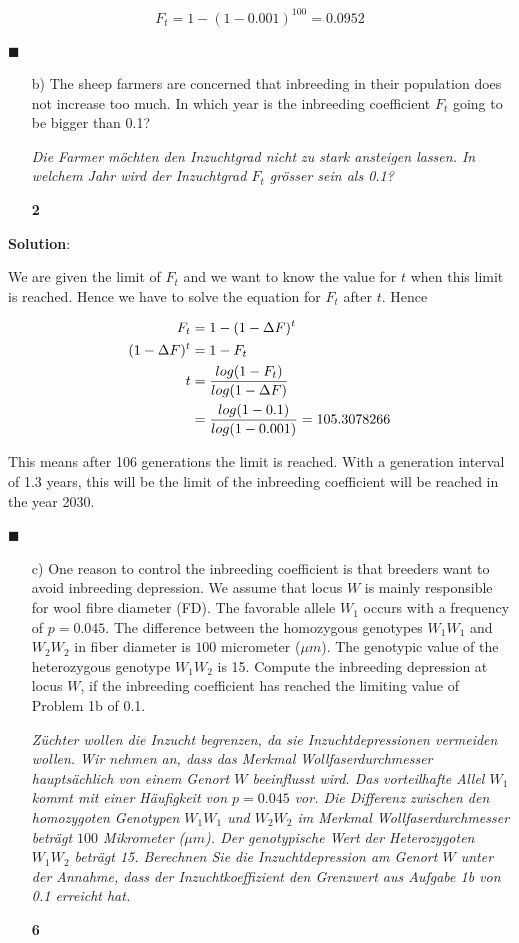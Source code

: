 \documentclass[
]{article}
\newcommand{\points}[1]
{\begin{flushright}\textbf{#1}\end{flushright}}
\newcommand{\solstart}
{\vspace{3ex}\textbf{Solution}:}
\newcommand{\solend}
{\vspace{2ex}$\blacksquare$}
\begin{document}
\[F_t = 1 - (1 - 0.001)^{100} = 0.0952\]

\solend

\clearpage
\pagebreak

\begin{enumerate}
\item[b)] The sheep farmers are concerned that inbreeding in their population does not increase too much. In which year is the inbreeding coefficient $F_t$ going to be bigger than 0.1?

\textit{Die Farmer möchten den Inzuchtgrad nicht zu stark ansteigen lassen. In welchem Jahr wird der Inzuchtgrad $F_t$ grösser sein als 0.1?}
\points{2}
\end{enumerate}

\solstart

We are given the limit of \(F_t\) and we want to know the value for
\(t\) when this limit is reached. Hence we have to solve the equation
for \(F_t\) after \(t\). Hence

\begin{align}
F_t  &=  1 - (1 - \Delta F)^t \notag \\
(1 - \Delta F)^t  &=  1 - F_t \notag \\
t  &=  \frac{log(1 - F_t)}{log(1 - \Delta F)}  \notag \\
   &=  \frac{log(1 - 0.1)}{log(1 - 0.001)} = 105.3078266  \notag 
\end{align}

This means after 106 generations the limit is reached. With a generation
interval of 1.3 years, this will be the limit of the inbreeding
coefficient will be reached in the year 2030.

\solend

\clearpage
\pagebreak

\begin{enumerate}
\item[c)] One reason to control the inbreeding coefficient is that breeders want to avoid inbreeding depression. We assume that locus $W$ is mainly responsible for wool fibre diameter (FD). The favorable allele $W_1$ occurs with a frequency of $p = 0.045$. The difference between the homozygous genotypes $W_1W_1$ and $W_2W_2$ in fiber diameter is $100$ micrometer ($\mu m$). The genotypic value of the heterozygous genotype $W_1W_2$ is 15. Compute the inbreeding depression at locus $W$, if the inbreeding coefficient has reached the limiting value of Problem 1b of 0.1.

\textit{Züchter wollen die Inzucht begrenzen, da sie Inzuchtdepressionen vermeiden wollen. Wir nehmen an, dass das Merkmal Wollfaserdurchmesser hauptsächlich von einem Genort $W$ beeinflusst wird. Das vorteilhafte Allel $W_1$ kommt mit einer Häufigkeit von $p = 0.045$ vor. Die Differenz zwischen den homozygoten Genotypen $W_1W_1$ und $W_2W_2$ im Merkmal Wollfaserdurchmesser beträgt $100$ Mikrometer ($\mu m$). Der genotypische Wert der Heterozygoten $W_1W_2$ beträgt 15. Berechnen Sie die Inzuchtdepression am Genort $W$ unter der Annahme, dass der Inzuchtkoeffizient den Grenzwert aus Aufgabe 1b von 0.1 erreicht hat.}
\points{6}
\end{enumerate}
\end{document}
